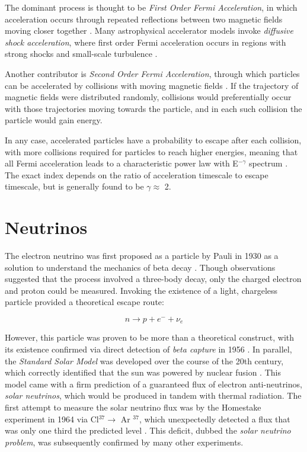The dominant process is thought to be \emph{First Order Fermi Acceleration}, in which acceleration occurs through repeated reflections between two magnetic fields moving closer together . Many astrophysical accelerator models invoke \emph{diffusive shock acceleration}, where first order Fermi acceleration occurs in regions with strong shocks and small-scale turbulence \cite{spurio_18}.

Another contributor is \emph{Second Order Fermi Acceleration}, through which particles can be accelerated by collisions with moving magnetic fields . If the trajectory of magnetic fields were distributed randomly, collisions would preferentially occur with those trajectories moving towards the particle, and in each such collision the particle would gain energy.

In any case, accelerated particles have a probability to escape after each collision, with more collisions required for particles to reach higher energies, meaning that all Fermi acceleration leads to a characteristic power law with E$^{-\gamma}$ spectrum . The exact index depends on the ratio of acceleration timescale to escape timescale, but is generally found to be $ \gamma \approx$ 2. 

\section{Neutrinos}

The electron neutrino was first proposed as a particle by Pauli in 1930 as a solution to understand the mechanics of beta decay . Though observations suggested that the process involved a three-body decay, only the charged electron and proton could be measured. Invoking the existence of a light, chargeless particle provided a theoretical escape route:

\begin{equation}
	n \rightarrow p + e^{-} + \nu_{e}
\end{equation}

 However, this particle was proven to be more than a theoretical construct, with its existence confirmed via direct detection of \emph{beta capture} in 1956 . In parallel, the \emph{Standard Solar Model} was developed over the course of the 20th century, which correctly identified that the sun was powered by nuclear fusion . This model came with a firm prediction of a guaranteed flux of electron anti-neutrinos, \emph{solar neutrinos}, which would be produced in tandem with thermal radiation. The first attempt to measure the solar neutrino flux was by the Homestake experiment in 1964 via Cl$^{37} \rightarrow$ Ar $^{37}$, which unexpectedly detected a flux that was only one third the predicted level . This deficit, dubbed the \emph{solar neutrino problem}, was subsequently confirmed by many other experiments.

